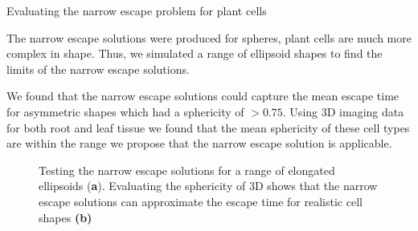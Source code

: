\documentclass[final]{beamer}
\begin{document}
\begin{frame}{}
\begin{textblock}{28}
    \begin{block}{Evaluating the narrow escape problem for plant cells}

      The narrow escape solutions were produced for spheres, plant
      cells are much more complex in shape. Thus, we simulated a range
      of ellipsoid shapes to find the limits of the narrow escape solutions.

      \vspace{1cm}

      We found that the narrow escape solutions could capture the
      mean escape time for asymmetric shapes which had a sphericity of
      $>0.75$. Using 3D imaging data for both root and leaf tissue we
      found that the mean sphericity of these cell types are within
      the range we propose that the narrow escape solution is
      applicable.

      \begin{figure}[!ht]
        \centering

        \caption[NarrowEp]{Testing the narrow escape solutions for a
          range of elongated ellipsoids (\textbf{a}). Evaluating the
          sphericity of 3D shows that the narrow escape solutions can
          approximate the escape time for realistic cell shapes \textbf{(b)}}
        \label{fig:nep}
      \end{figure}



\end{block}
\end{textblock}
\end{frame}
\end{document}
